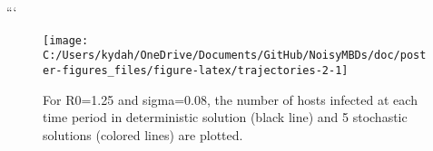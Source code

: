 \documentclass[
]{article}
\begin{document}
```

\begin{figure}[H]

{\centering \texttt{[image: C:/Users/kydah/OneDrive/Documents/GitHub/NoisyMBDs/doc/poster-figures\_files/figure-latex/trajectories-2-1]} 

}

\caption{\label{fig:SDEtrajectories} For R0=1.25 and sigma=0.08, the number of hosts infected at each time period in deterministic solution (black line) and 5 stochastic solutions (colored lines) are plotted.}\label{fig:trajectories-2}
\end{figure}
\end{document}

